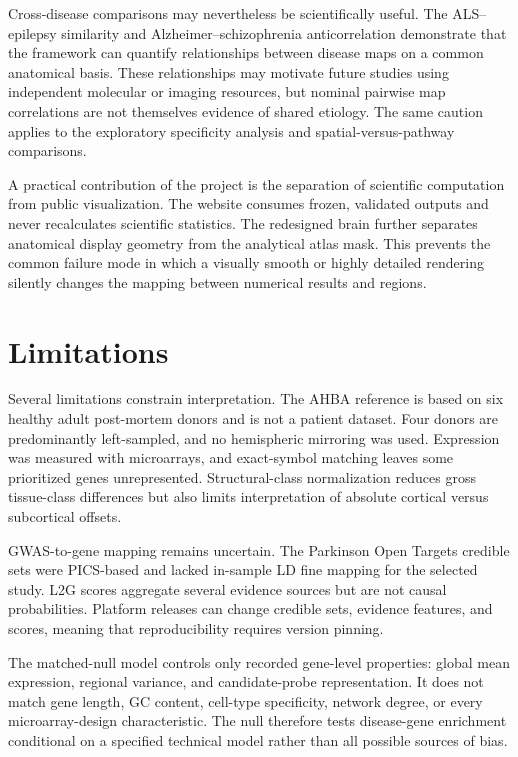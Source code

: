 \documentclass[10pt,twocolumn]{article}
\begin{document}
Cross-disease comparisons may nevertheless be scientifically useful. The ALS--epilepsy similarity and Alzheimer--schizophrenia anticorrelation demonstrate that the framework can quantify relationships between disease maps on a common anatomical basis. These relationships may motivate future studies using independent molecular or imaging resources, but nominal pairwise map correlations are not themselves evidence of shared etiology. The same caution applies to the exploratory specificity analysis and spatial-versus-pathway comparisons.

A practical contribution of the project is the separation of scientific computation from public visualization. The website consumes frozen, validated outputs and never recalculates scientific statistics. The redesigned brain further separates anatomical display geometry from the analytical atlas mask. This prevents the common failure mode in which a visually smooth or highly detailed rendering silently changes the mapping between numerical results and regions.

\section{Limitations}

Several limitations constrain interpretation. The AHBA reference is based on six healthy adult post-mortem donors and is not a patient dataset. Four donors are predominantly left-sampled, and no hemispheric mirroring was used. Expression was measured with microarrays, and exact-symbol matching leaves some prioritized genes unrepresented. Structural-class normalization reduces gross tissue-class differences but also limits interpretation of absolute cortical versus subcortical offsets.

GWAS-to-gene mapping remains uncertain. The Parkinson Open Targets credible sets were PICS-based and lacked in-sample LD fine mapping for the selected study. L2G scores aggregate several evidence sources but are not causal probabilities. Platform releases can change credible sets, evidence features, and scores, meaning that reproducibility requires version pinning.

The matched-null model controls only recorded gene-level properties: global mean expression, regional variance, and candidate-probe representation. It does not match gene length, GC content, cell-type specificity, network degree, or every microarray-design characteristic. The null therefore tests disease-gene enrichment conditional on a specified technical model rather than all possible sources of bias.
\end{document}
